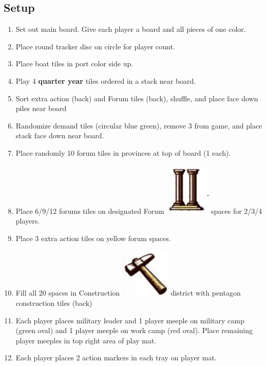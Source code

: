 \documentclass[10pt]{article}
\newenvironment{enumerateCustom}
{\begin{enumerate}
  \setlength{\itemsep}{1pt}
  \setlength{\parskip}{0pt}
  \setlength{\parsep}{0pt}}
{\end{enumerate}}
\begin{document}
\begin{multicols*}{2}

\section*{Setup}
    \begin{enumerateCustom}
        \item Set out main board. Give each player a board and all pieces of one color. 
        \item Place round tracker disc on circle for player count. 
        \item Place boat tiles in port color side up.
        \item Play 4 \textbf{quarter year} tiles ordered in a stack near board.
        \item Sort extra action (back) and Forum tiles (back), shuffle, and place face down piles near board
        \item Randomize demand tiles (circular blue green), remove 3 from game, and place stack face down near board.
        \item Place randomly 10 forum tiles in provinces at top of board (1 each).
        \item Place 6/9/12 forums tiles on designated Forum \includegraphics[scale=0.2]{images/forum.jpg} spaces for 2/3/4 players.
        \item Place 3 extra action tiles on yellow forum spaces.
        \item Fill all 20 spaces in Construction \protect\includegraphics[scale=0.2]{images/construction.jpg} district with pentagon construction tiles (back)
        \item Each player places military leader and 1 player meeple on military camp (green oval) and 1 player meeple on work camp (red oval). Place remaining player meeples in top right area of play mat.
        \item Each player places 2 action markers in each tray on player mat.

\end{enumerateCustom}
\end{multicols*}
\end{document}
